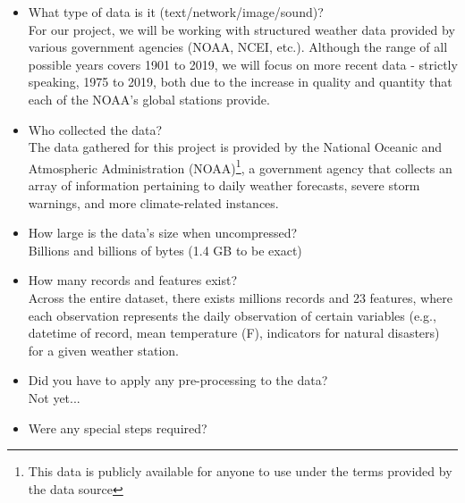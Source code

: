 \documentclass[conference]{IEEEtran}
\begin{document}
\begin{itemize}

  \item What type of data is it (text/network/image/sound)? \\

  For our project, we will be working with structured weather data provided by various government agencies (NOAA, NCEI, etc.). Although the range of all possible years covers 1901 to 2019, we will focus on more recent data - strictly speaking, 1975 to 2019, both due to the increase in quality and quantity that each of the NOAA's global stations provide. \\

  \item Who collected the data? \\

  The data gathered for this project is provided by the National Oceanic and Atmospheric Administration (NOAA)\footnote{This data is publicly available for anyone to use under the terms provided by the data source}, a government agency that collects an array of information pertaining to daily weather forecasts, severe storm warnings, and more climate-related instances. \\

  \item How large is the data's size when uncompressed? \\

  Billions and billions of bytes (1.4 GB to be exact) \\

  \item How many records and features exist? \\

  Across the entire dataset, there exists millions records and 23 features, where each observation represents the daily observation of certain variables (e.g., datetime of record, mean temperature (F), indicators for natural disasters) for a given weather station. \\

  \item Did you have to apply any pre-processing to the data? \\

  Not yet... \\

  \item Were any special steps required? \\


\end{itemize}
\end{document}
